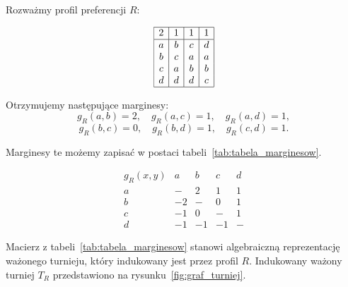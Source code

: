 \documentclass[12pt,a4paper]{mwrep}
\begin{document}
	\begin{example}
		\label{przyklad:truniej-wiekszosciowy}
		Rozważmy profil preferencji \(R\):
		\begin{table}[H]
			\centering
			\[
			\begin{array}{|c|c|c|c|}
				\hline
				2 & 1 & 1 & 1\\
				\hline
				a & b & c & d\\
				b & c & a & a\\
				c & a & b & b\\
				d & d & d & c\\
				\hline
			\end{array}
			\]
			\caption{Profil preferencji \(R\)}
			\label{tab:profil_R_przyklad}
		\end{table}
		
		Otrzymujemy następujące marginesy:
		\[
		g_R(a,b)=2,\quad g_R(a,c)=1,\quad g_R(a,d)=1,
		\]
		\[
		g_R(b,c)=0,\quad g_R(b,d)=1,\quad g_R(c,d)=1.
		\]
		
		Marginesy te możemy zapisać w postaci tabeli~\ref{tab:tabela_marginesow}.
		
		\begin{table}[H]
			\centering
			\[
			\begin{array}{c|cccc}
				g_R(x,y) & a & b & c & d\\
				\hline
				a & - & 2 & 1 & 1\\
				b & -2 & - & 0 & 1\\
				c & -1 & 0 & - & 1\\
				d & -1 & -1 & -1 & -
			\end{array}
			\]
			\caption{Macierz marginesów większości profilu \(R\)}
			\label{tab:tabela_marginesow}
		\end{table}
	
		Macierz z tabeli~\ref{tab:tabela_marginesow} stanowi algebraiczną reprezentację ważonego turnieju, który indukowany jest przez profil \(R\). Indukowany ważony turniej \(T_R\) przedstawiono na rysunku~\ref{fig:graf_turniej}.
		
		\begin{figure}[H]
			\centering
			
\end{figure}
\end{example}
\end{document}
